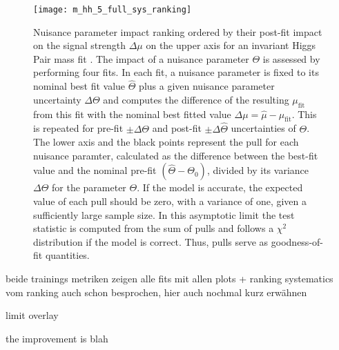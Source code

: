\begin{figure}
    \centering
    \texttt{[image: m\_hh\_5\_full\_sys\_ranking]}
    \caption[]{
        Nuisance parameter impact ranking ordered by their post-fit impact on the signal strength $\Delta\mu$ on the upper axis for an invariant Higgs Pair mass fit \mhh{}. The impact of a nuisance parameter $\Theta$ is assessed by performing four fits. In each fit, a nuisance parameter is fixed to its nominal best fit value $\hat{\Theta}$ plus a given nuisance parameter uncertainty $\Delta\Theta$ and computes the difference of the resulting $\mu_\text{fit}$ from this fit with the nominal best fitted value $\Delta\mu=\hat{\mu} - \mu_\text{fit}$. This is repeated for pre-fit $\pm\Delta\Theta$ and post-fit $\pm\Delta\hat{\Theta}$ uncertainties of $\Theta$. The lower axis and the black points represent the pull for each nuisance paramter, calculated as the difference between the best-fit value and the nominal pre-fit $(\hat{\Theta} - \Theta_0)$, divided by its variance $\Delta\Theta$ for the parameter $\Theta$. If the model is accurate, the expected value of each pull should be zero, with a variance of one, given a sufficiently large sample size. In this asymptotic limit the test statistic is computed from the sum of pulls and follows a $\chi^2$ distribution if the model is correct. Thus, pulls serve as goodness-of-fit quantities. }
    \label{fig:m_hh_full_sys_ranking}
\end{figure}



beide trainings metriken zeigen
alle fits mit allen plots + ranking
systematics vom ranking auch schon besprochen, hier auch nochmal kurz erwähnen

limit overlay

the improvement is blah



